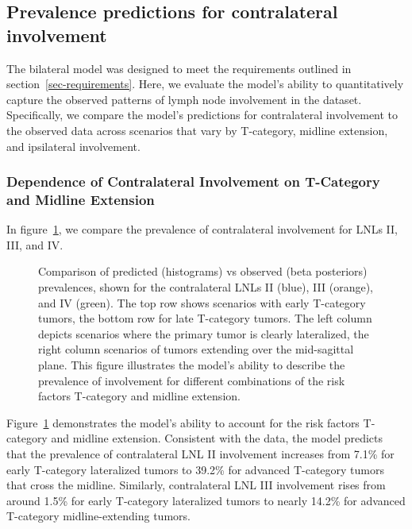 \documentclass[
  sn-mathphys-num,
]{sn-jnl}
\makeatletter
\newcommand*\pandocbounded[1]{%
  \sbox\pandoc@box{#1}%
  \Gscale@div\@tempa{\textheight}{\dimexpr\ht\pandoc@box+\dp\pandoc@box\relax}%
  \Gscale@div\@tempb{\linewidth}{\wd\pandoc@box}%
  \ifdim\@tempb\p@<\@tempa\p@\let\@tempa\@tempb\fi%
  \ifdim\@tempa\p@<\p@\scalebox{\@tempa}{\usebox\pandoc@box}%
  \else\usebox{\pandoc@box}%
  \fi%
}
\makeatother
\begin{document}
\subsection{Prevalence predictions for contralateral
involvement}\label{prevalence-predictions-for-contralateral-involvement}

The bilateral model was designed to meet the requirements outlined in
section~\ref{sec-requirements}. Here, we evaluate the model's ability to
quantitatively capture the observed patterns of lymph node involvement
in the dataset. Specifically, we compare the model's predictions for
contralateral involvement to the observed data across scenarios that
vary by T-category, midline extension, and ipsilateral involvement.

\subsubsection{Dependence of Contralateral Involvement on T-Category and
Midline
Extension}\label{dependence-of-contralateral-involvement-on-t-category-and-midline-extension}

In figure~\ref{fig-model-prevalences-overall}, we compare the prevalence
of contralateral involvement for LNLs II, III, and IV.

\begin{figure}

\centering{

\pandocbounded{}

}

\caption{\label{fig-model-prevalences-overall}Comparison of predicted
(histograms) vs observed (beta posteriors) prevalences, shown for the
contralateral LNLs II (blue), III (orange), and IV (green). The top row
shows scenarios with early T-category tumors, the bottom row for late
T-category tumors. The left column depicts scenarios where the primary
tumor is clearly lateralized, the right column scenarios of tumors
extending over the mid-sagittal plane. This figure illustrates the
model's ability to describe the prevalence of involvement for different
combinations of the risk factors T-category and midline extension.}

\end{figure}%

Figure~\ref{fig-model-prevalences-overall} demonstrates the model's
ability to account for the risk factors T-category and midline
extension. Consistent with the data, the model predicts that the
prevalence of contralateral LNL II involvement increases from 7.1\% for
early T-category lateralized tumors to 39.2\% for advanced T-category
tumors that cross the midline. Similarly, contralateral LNL III
involvement rises from around 1.5\% for early T-category lateralized
tumors to nearly 14.2\% for advanced T-category midline-extending
tumors.
\end{document}
